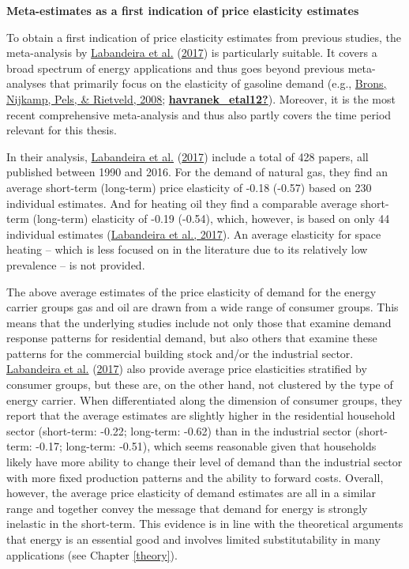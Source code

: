 \documentclass[12pt,twoside]{reedthesis}
\begin{document}
\textbf{Meta-estimates as a first indication of price elasticity estimates}

To obtain a first indication of price elasticity estimates from previous studies, the meta-analysis by \protect\hyperlink{ref-labandeira_etal17}{Labandeira et al.} (\protect\hyperlink{ref-labandeira_etal17}{2017}) is particularly suitable. It covers a broad spectrum of energy applications and thus goes beyond previous meta-analyses that primarily focus on the elasticity of gasoline demand (e.g., \protect\hyperlink{ref-brons_etal08}{Brons, Nijkamp, Pels, \& Rietveld, 2008}; \protect\hyperlink{ref-havranek_etal12}{\textbf{havranek\_etal12?}}). Moreover, it is the most recent comprehensive meta-analysis and thus also partly covers the time period relevant for this thesis.

In their analysis, \protect\hyperlink{ref-labandeira_etal17}{Labandeira et al.} (\protect\hyperlink{ref-labandeira_etal17}{2017}) include a total of 428 papers, all published between 1990 and 2016. For the demand of natural gas, they find an average short-term (long-term) price elasticity of -0.18 (-0.57) based on 230 individual estimates. And for heating oil they find a comparable average short-term (long-term) elasticity of -0.19 (-0.54), which, however, is based on only 44 individual estimates (\protect\hyperlink{ref-labandeira_etal17}{Labandeira et al., 2017}). An average elasticity for space heating -- which is less focused on in the literature due to its relatively low prevalence -- is not provided.

The above average estimates of the price elasticity of demand for the energy carrier groups gas and oil are drawn from a wide range of consumer groups. This means that the underlying studies include not only those that examine demand response patterns for residential demand, but also others that examine these patterns for the commercial building stock and/or the industrial sector. \protect\hyperlink{ref-labandeira_etal17}{Labandeira et al.} (\protect\hyperlink{ref-labandeira_etal17}{2017}) also provide average price elasticities stratified by consumer groups, but these are, on the other hand, not clustered by the type of energy carrier. When differentiated along the dimension of consumer groups, they report that the average estimates are slightly higher in the residential household sector (short-term: -0.22; long-term: -0.62) than in the industrial sector (short-term: -0.17; long-term: -0.51), which seems reasonable given that households likely have more ability to change their level of demand than the industrial sector with more fixed production patterns and the ability to forward costs. Overall, however, the average price elasticity of demand estimates are all in a similar range and together convey the message that demand for energy is strongly inelastic in the short-term. This evidence is in line with the theoretical arguments that energy is an essential good and involves limited substitutability in many applications (see Chapter \ref{theory}).
\end{document}
